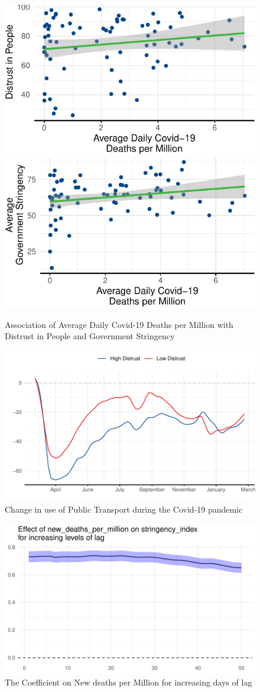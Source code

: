 \documentclass[
  12pt,
]{article}
\begin{document}
\begin{figure}
\includegraphics[width=0.48\linewidth]{write_up_test_files/figure-latex/deaths-plots-1} \includegraphics[width=0.48\linewidth]{write_up_test_files/figure-latex/deaths-plots-2} \caption{Association of Average Daily Covid-19 Deaths per Million with Distrust in People and Government Stringency}\label{fig:deaths-plots}
\end{figure}

\begin{figure}
\includegraphics[width=0.8\linewidth]{write_up_test_files/figure-latex/mobility-plot-1} \caption{Change in use of Public Transport during the Covid-19 pandemic}\label{fig:mobility-plot}
\end{figure}

\begin{figure}
\includegraphics[width=0.8\linewidth]{write_up_test_files/figure-latex/lag-deaths-1} \caption{The Coefficient on New deaths per Million for increasing days of lag}\label{fig:lag-deaths}
\end{figure}
\end{document}
